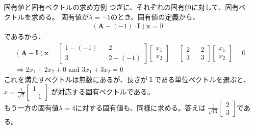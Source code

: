 \documentclass[dvipdfmx,autodetect-engine, unicode, 10pt, aspectratio=169]{beamer}
\begin{document}
\begin{frame}{固有値と固有ベクトルの求め方例}
    つぎに、それぞれの固有値に対して、固有ベクトルを求める。
    固有値が$\lambda = -1$のとき、固有値の定義から、
    \begin{align*}
        (\bm{A} - (-1)\cdot \bm{I} )\bm{x} = 0
    \end{align*}
    であるから、
    \begin{align*}
        &(\bm{A} - \bm{I})\bm{x} = 
            \begin{bmatrix}
                1-(-1) && 2 \\
                3 && 2 - (-1)
            \end{bmatrix}
            \begin{bmatrix}
                x_1 \\ x_2
            \end{bmatrix} = 
            \begin{bmatrix}
                2 && 2 \\
                3 && 3
            \end{bmatrix}
            \begin{bmatrix}
                x_1 \\ x_2
            \end{bmatrix} = 0 \\
            &\Rightarrow 2x_1 + 2x_2 +0 \text{ and } 3x_1 + 3x_2 = 0
    \end{align*}
    これを満たすベクトルは無数にあるが、長さが１である単位ベクトルを選ぶと、\\
    $x = \frac{1}{\sqrt{2}}\begin{bmatrix}
        1 \\ -1
    \end{bmatrix}$
    が対応する固有ベクトルである。\\もう一方の固有値$\lambda =4$に対する固有値も、同様に求める。答えは
    $\frac{1}{\sqrt{13}}\begin{bmatrix}
        2 \\ 3
    \end{bmatrix}$である。
    
\end{frame}
\end{document}
